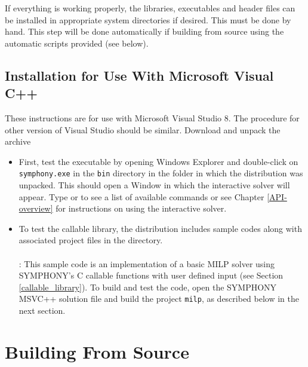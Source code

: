 If everything is working properly, the libraries, executables and header files
can be installed in appropriate system directories if desired. This must be
done by hand. This step will be done automatically if building from source
using the automatic scripts provided (see below).

\subsection{Installation for Use With Microsoft Visual C++}

These instructions are for use with Microsoft Visual Studio 8. The procedure
for other version of Visual Studio should be similar. Download and unpack the
archive 
\begin{itemize}

\item First, test the executable by opening Windows Explorer and double-click
on {\color{Brown}\texttt{symphony.exe}} in the {\color{Brown}\texttt{bin}}
directory in the folder in which the distribution was unpacked. This should
open a Window in which the interactive solver will appear. Type 
or  to see a list of available commands or see Chapter
\ref{API-overview} for instructions on using the interactive solver.

\item To test the callable library, the distribution includes sample codes
along with associated project files in the  directory. \\ \\
: This sample code is an implementation of a basic MILP
solver using SYMPHONY's C callable functions with user defined input (see
Section \ref{callable_library}). To build and test the code, open the SYMPHONY
MSVC++ solution file and build the project {\color{Brown}\texttt{milp}}, as
described below in the next section.

\end{itemize}



\section{Building From Source} 
\label{building_from_source}

